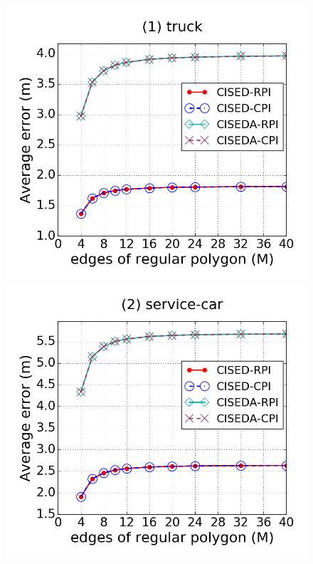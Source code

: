 

\begin{figure}[tb!]
\centering
\includegraphics[scale = 0.250]{figures/Exp-M-e-10-error-truck.png}
\includegraphics[scale = 0.250]{figures/Exp-M-e-10-error-service.png}

\end{figure}
